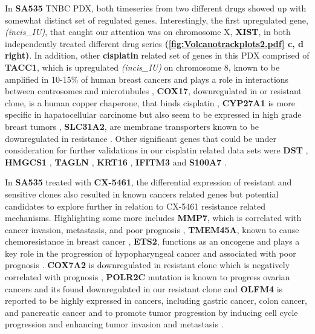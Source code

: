 In \textbf{SA535} TNBC PDX, both timeseries from two different drugs showed up with somewhat distinct set of regulated genes. Interestingly, the first upregulated gene,\textit{(incis\_IU)}, that caught our attention was on chromosome X, \textbf{XIST}\cite{salama2020xist,chen2017long, chen2019up}, in both independently treated different drug series \textbf{(\autoref{fig:Volcanotrackplots2.pdf} c, d right)}. 
In addition, other \textbf{cisplatin} related set of genes in this PDX comprised of \textbf{TACC1}, which is upregulated \textit{(incis\_IU)} on chromosome 8, known to be amplified in 10-15\% of human breast cancers and plays a role in interactions between centrosomes and microtubules \cite{ray2004genomic, gergely2000tacc, shakya2018high},
\textbf{COX17}, downregulated in or resistant clone, is a human copper chaperone, that binds cisplatin \cite{katano2002acquisition, zhao2014cisplatin}, \textbf{CYP27A1} is more specific in hapatocellular carcinome but also seem to be expressed in high grade breast tumors \cite{liang2019cyp27a1, wu201327}, \textbf{SLC31A2}, are membrane transporters known to be downregulated in resistance \cite{bai2017structural}. Other significant genes that could be under consideration for further validations in our cisplatin related data sets were \textbf{DST}  \cite{salerno2016human,lee2012differentially}, \textbf{HMGCS1} \cite{walsh2020mevalonate},
\textbf{TAGLN} \cite{wu2014transgelin, elsafadi2020transgelin},
\textbf{KRT16} \cite{huang2019novel},
\textbf{IFITM3} \cite{liu2019ifitm3} and
\textbf{S100A7} \cite{zhang2019clinical, mayama2018olfm}.

In \textbf{SA535} treated with \textbf{CX-5461}, the differential expression of resistant and sensitive clones also resulted in known cancers related genes but potential candidates to explore further in relation to CX-5461 resistance related mechanisms. Highlighting some more includes \textbf{MMP7}, which is correlated with cancer invasion, metastasis, and poor prognosis \cite{mcgowan2008matrix} ,
\textbf{TMEM45A}, known to cause chemoresistance in breast cancer \cite{schmit2019characterization},
\textbf{ETS2}, functions as an oncogene and plays a key role in the progression of hypopharyngeal cancer and associated with poor prognosis \cite{fu2017high, ge2008role}.
\textbf{COX7A2} is downregulated in resistant clone which is negatively correlated with prognosis \cite{deng2018overexpression},
\textbf{POLR2C} mutation is known to progress ovarian cancers and its found downregulated in our resistant clone \cite {moriwaki2017polr2c} and
\textbf{OLFM4} is reported to be highly expressed in cancers, including gastric cancer, colon cancer, and pancreatic cancer and to promote tumor progression by inducing cell cycle progression and enhancing tumor invasion and metastasis \cite{ashizawa2019olfm4}.

